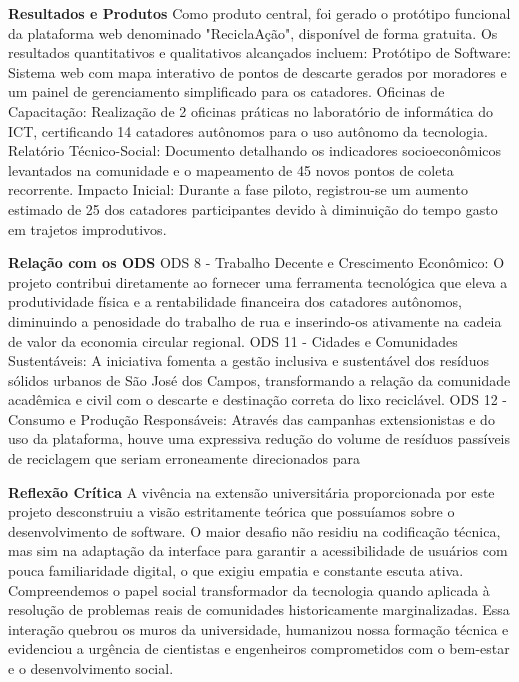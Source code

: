 \documentclass[12pt,openright,oneside,a4paper]{report}
\begin{document}
\vspace{0.7cm}
\noindent
\textbf{Resultados e Produtos}
Como produto central, foi gerado o protótipo funcional da plataforma web denominado "ReciclaAção",
disponível de forma gratuita. Os resultados quantitativos e qualitativos alcançados incluem:
Protótipo de Software: Sistema web com mapa interativo de pontos de descarte gerados por
moradores e um painel de gerenciamento simplificado para os catadores.
Oficinas de Capacitação: Realização de 2 oficinas práticas no laboratório de informática do ICT,
certificando 14 catadores autônomos para o uso autônomo da tecnologia.
Relatório Técnico-Social: Documento detalhando os indicadores socioeconômicos levantados na
comunidade e o mapeamento de 45 novos pontos de coleta recorrente.
Impacto Inicial: Durante a fase piloto, registrou-se um aumento estimado de 25%
dos catadores participantes devido à diminuição do tempo gasto em trajetos improdutivos.

\vspace{0.7cm}
\noindent
\textbf{Relação com os ODS}
ODS 8 - Trabalho Decente e Crescimento Econômico: O projeto contribui diretamente ao fornecer
uma ferramenta tecnológica que eleva a produtividade física e a rentabilidade financeira dos catadores
autônomos, diminuindo a penosidade do trabalho de rua e inserindo-os ativamente na cadeia de valor
da economia circular regional.
ODS 11 - Cidades e Comunidades Sustentáveis: A iniciativa fomenta a gestão inclusiva e sustentável
dos resíduos sólidos urbanos de São José dos Campos, transformando a relação da comunidade
acadêmica e civil com o descarte e destinação correta do lixo reciclável.
ODS 12 - Consumo e Produção Responsáveis: Através das campanhas extensionistas e do uso da
plataforma, houve uma expressiva redução do volume de resíduos passíveis de reciclagem que seriam
erroneamente direcionados para

\vspace{0.7cm}
\noindent
\textbf{Reflexão Crítica}
A vivência na extensão universitária proporcionada por este projeto desconstruiu a visão estritamente
teórica que possuíamos sobre o desenvolvimento de software. O maior desafio não residiu na
codificação técnica, mas sim na adaptação da interface para garantir a acessibilidade de usuários com
pouca familiaridade digital, o que exigiu empatia e constante escuta ativa. Compreendemos o papel
social transformador da tecnologia quando aplicada à resolução de problemas reais de comunidades
historicamente marginalizadas. Essa interação quebrou os muros da universidade, humanizou nossa
formação técnica e evidenciou a urgência de cientistas e engenheiros comprometidos com o bem-estar
e o desenvolvimento social.
\end{document}
